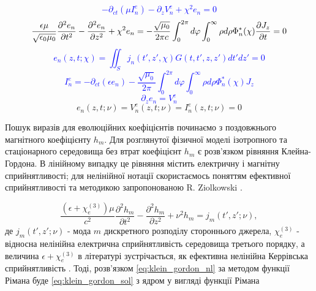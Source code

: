 \textcolor{blue}{ \begin{equation*}
- \partial_{ct}(\mu I_n^e) - \partial_z V_n^e + \chi^2 e_n = 0
\end{equation*} }
%
\textcolor{blue}{ \begin{equation*}
\frac{\epsilon \mu}{ \sqrt{\epsilon_0 \mu_0}} 
\frac{\partial^2 e_n}{\partial t^2} - 
\frac{\partial^2 e_n}{\partial z^2} + \chi^2 e_n = 
- \frac{\sqrt{\mu_0}}{2 \pi c} 
\int_0^{2\pi} d \varphi 
\int_0^\infty \rho d \rho \Phi_n^* (\chi) \frac{\partial J_z}{\partial t} = 0
\end{equation*} }
%
\textcolor{blue}{ \begin{equation*}
e_n (z, t; \chi) = \iint_S j_n (t',z', \chi) G(t,t',z,z') dt' dz' = 0
\end{equation*} }
%
\textcolor{blue}{ \begin{equation*}
I_n^e = - \partial_{ct} (\epsilon e_n) - 
\frac{\sqrt{\mu_0}}{2 \pi} \int_0^{2\pi} d \varphi 
\int_0^{\infty} \rho d \rho \Phi_n^* (\chi) J_z
\end{equation*} }
%
\textcolor{blue}{ \begin{equation*}
\partial_{z} e_n = V_n^e
\end{equation*} }
%
\begin{equation} \label{eq:e_evolution}
e_n (z, t; \nu) = V_n^e (z, t; \nu) = I_n^e (z, t; \nu) = 0
\end{equation}

Пошук виразів для еволюційних коефіцієнтів починаємо з поздовжнього 
магнітного коефіцієнту $ h_m $. Для розглянутої фізичної моделі ізотропного
та стаціонарного середовища без втрат коефіцієнт $ h_m $ є розв'язком 
рівняння Клейна-Гордона. В лінійному випадку це рівняння містить електричну 
і магнітну сприйнятливості; для нелінійної нотації скористаємось поняттям 
ефективної сприйнятливості та методикою запропонованою R. Ziolkowski
\cite{imp:Ziolkowski1993}.

\begin{equation} \label{eq:klein_gordon_nl}
\frac{(\epsilon + \chi_e^{(3)}) \mu}{c^2} 
\frac{\partial^2 h_m}{\partial t^2} - 
\frac{\partial^2 h_m}{\partial z^2} + 
\nu^2 h_m = j_m (t',z'; \nu),
\end{equation}
%
де $ j_m (t',z'; \nu) $ - мода $ m $ дискретного розподілу стороннього 
джерела, $ \chi_e^{(3)} $ - відносна нелінійна електрична сприйнятливість 
середовища третього порядку, а величина $ \epsilon + \chi_e^{(3)} $ в 
літературі зустрічається, як ефективна нелінійна Керрівська сприйнятливість 
\cite{imp:Ziolkowski1993}. Тоді, розв'язком \eqref{eq:klein_gordon_nl} за 
методом функції Рімана буде \eqref{eq:klein_gordon_sol} з ядром у вигляді 
функції Рімана

